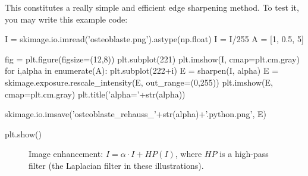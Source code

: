 This constitutes a really simple and efficient edge sharpening method. To test it, you may write this example code:
\begin{python}
I = skimage.io.imread('osteoblaste.png').astype(np.float)
I = I/255
A = [1, 0.5, 5]

fig = plt.figure(figsize=(12,8))
plt.subplot(221)
plt.imshow(I, cmap=plt.cm.gray)
for i,alpha in enumerate(A):
    plt.subplot(222+i)
    E = sharpen(I, alpha)
    E = skimage.exposure.rescale_intensity(E, out_range=(0,255))
    plt.imshow(E, cmap=plt.cm.gray)
    plt.title('alpha='+str(alpha))
    
    skimage.io.imsave('osteoblaste_rehauss_'+str(alpha)+'.python.png', E)

plt.show()
\end{python}


\begin{figure}[htbp]
 \centering
 
 \hspace{1cm}
 
 \hspace{1cm}

 \caption{Image enhancement: $I=\alpha\cdot I+HP(I)$, where $HP$ is a high-pass filter (the Laplacian filter in these illustrations).}
 \label{fig:introduction:matlab:enhancement}
\end{figure}
